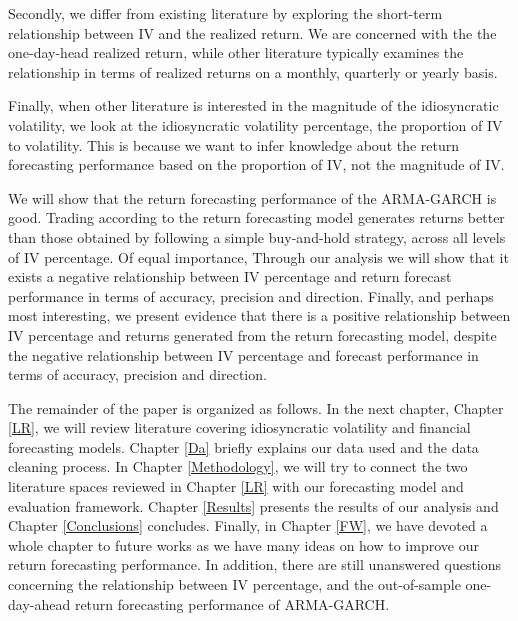 Secondly, we differ from existing literature by exploring the short-term relationship between IV and the realized return. We are concerned with the the one-day-head realized return, while other literature typically examines the relationship in terms of realized returns on a monthly, quarterly or yearly basis.

Finally, when other literature is interested in the magnitude of the idiosyncratic volatility, we look at the idiosyncratic volatility percentage, the proportion of IV to volatility. This is because we want to infer knowledge about the return forecasting performance based on the proportion of IV, not the magnitude of IV.

We will show that the return forecasting performance of the ARMA-GARCH is good. Trading according to the return forecasting model generates returns better than those obtained by following a simple buy-and-hold strategy, across all levels of IV percentage. Of equal importance, Through our analysis we will show that it exists a negative relationship between IV percentage and return forecast performance in terms of accuracy, precision and direction. Finally, and perhaps most interesting, we present evidence that there is a positive relationship between IV percentage and returns generated from the return forecasting model, despite the negative relationship between IV percentage and forecast performance in terms of accuracy, precision and direction. 

The remainder of the paper is organized as follows. In the next chapter, Chapter \ref{LR}, we will review literature covering idiosyncratic volatility and financial forecasting models. Chapter \ref{Da} briefly explains our data used and the data cleaning process. In Chapter \ref{Methodology}, we will try to connect the two literature spaces reviewed in Chapter \ref{LR} with our forecasting model and evaluation framework. Chapter \ref{Results} presents the results of our analysis and Chapter \ref{Conclusions} concludes. Finally, in Chapter \ref{FW}, we have devoted a whole chapter to future works as we have many ideas on how to improve our return forecasting performance. In addition, there are still unanswered questions concerning the relationship between IV percentage, and the out-of-sample one-day-ahead return forecasting performance of ARMA-GARCH.

